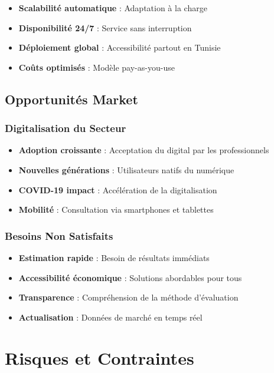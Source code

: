 \begin{itemize}
    \item \textbf{Scalabilité automatique} : Adaptation à la charge
    \item \textbf{Disponibilité 24/7} : Service sans interruption
    \item \textbf{Déploiement global} : Accessibilité partout en Tunisie
    \item \textbf{Coûts optimisés} : Modèle pay-as-you-use
\end{itemize}

\subsection{Opportunités Market}
\label{subsec:opportunites_marche}

\subsubsection{Digitalisation du Secteur}

\begin{itemize}
    \item \textbf{Adoption croissante} : Acceptation du digital par les professionnels
    \item \textbf{Nouvelles générations} : Utilisateurs natifs du numérique
    \item \textbf{COVID-19 impact} : Accélération de la digitalisation
    \item \textbf{Mobilité} : Consultation via smartphones et tablettes
\end{itemize}

\subsubsection{Besoins Non Satisfaits}

\begin{itemize}
    \item \textbf{Estimation rapide} : Besoin de résultats immédiats
    \item \textbf{Accessibilité économique} : Solutions abordables pour tous
    \item \textbf{Transparence} : Compréhension de la méthode d'évaluation
    \item \textbf{Actualisation} : Données de marché en temps réel
\end{itemize}

\section{Risques et Contraintes}
\label{sec:risques_contraintes}

